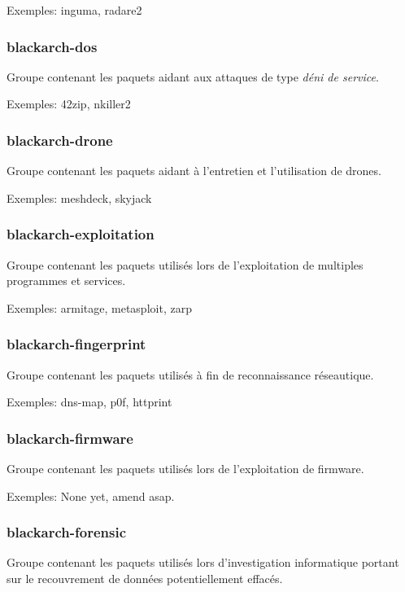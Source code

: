 \documentclass[a4paper, oneside, 11pt]{book}
\begin{document}
Exemples: inguma, radare2

\subsubsection{blackarch-dos}

Groupe contenant les paquets aidant aux attaques de type \textit{déni de service}.

Exemples: 42zip, nkiller2

\subsubsection{blackarch-drone}

Groupe contenant les paquets aidant à l'entretien et l'utilisation de drones.

Exemples: meshdeck, skyjack

\subsubsection{blackarch-exploitation}

Groupe contenant les paquets utilisés lors de l'exploitation de multiples
programmes et services.

Exemples: armitage, metasploit, zarp

\subsubsection{blackarch-fingerprint}

Groupe contenant les paquets utilisés à fin de reconnaissance réseautique.

Exemples: dns-map, p0f, httprint

\subsubsection{blackarch-firmware}

Groupe contenant les paquets utilisés lors de l'exploitation de firmware.

Exemples: None yet, amend asap.

\subsubsection{blackarch-forensic}

Groupe contenant les paquets utilisés lors d'investigation informatique portant
sur le recouvrement de données potentiellement effacés.
\end{document}
